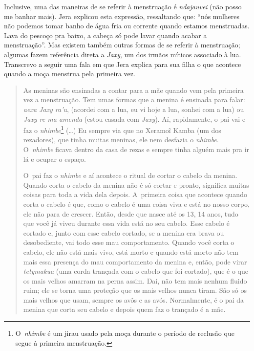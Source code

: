 Inclusive, uma das maneiras de se referir à menstruação é \emph{ndajauvei} (não
posso me banhar mais). Jera explicou esta expressão, ressaltando que:
``nós mulheres não podemos tomar banho de água fria ou corrente quando
estamos menstruadas. Lava do pescoço pra baixo, a cabeça só pode lavar
quando acabar a menstruação''. Mas existem também outras formas de se
referir à menstruação; algumas fazem referência direta a \emph{Jaxy}, um dos
irmãos míticos associado à lua. Transcrevo a seguir uma fala em que
Jera explica para sua filha o que acontece quando a moça menstrua pela
primeira vez. 

\begin{quote}
\noindent
As meninas são ensinadas a contar para a mãe quando vem pela primeira
vez a menstruação. Tem umas formas que a menina é ensinada para falar:
\emph{aexa Jaxy ra’u}, (acordei com a lua, eu vi hoje a lua, sonhei com a lua)
ou \emph{Jaxy re ma amenda} (estou casada com \emph{Jaxy}). Aí, rapidamente, o pai
vai e faz o \emph{nhimbe}\footnote{O~\emph{nhimbe} é um jirau usado pela moça durante
o período de reclusão que segue à primeira menstruação.} (\ldots{}) Eu
sempre via que no Xeramoĩ Kamba (um dos rezadores), que tinha muitas
meninas, ele nem desfazia o \emph{nhimbe}. O~\emph{nhimbe} ficava dentro da casa de
rezas e sempre tinha alguém mais pra ir lá e ocupar o espaço. 

\noindent
O~pai faz o \emph{nhimbe} e aí acontece o ritual de cortar o cabelo da menina.
Quando corta o cabelo da menina não é só cortar e pronto, significa
muitas coisas para toda a vida dela depois. A~primeira coisa que
acontece quando corta o cabelo é que, como o cabelo é uma coisa viva e
está no nosso corpo, ele não para de crescer. Então, desde que nasce
até os 13, 14 anos, tudo que você já viveu durante essa vida está no
seu cabelo. Esse cabelo é cortado e, junto com esse cabelo cortado, se
a menina era brava ou desobediente, vai todo esse mau comportamento.
Quando você corta o cabelo, ele não está mais vivo, está morto e quando
está morto não tem mais essa presença do mau comportamento da menina e,
então, pode virar \emph{tetymakua} (uma corda trançada com o cabelo que foi
cortado), que é o que os mais velhos amarram na perna assim. Daí, não
tem mais nenhum fluido ruim; ele se torna uma proteção que os mais
velhos nunca tiram. São só os mais velhos que usam, sempre os avôs e as
avós. Normalmente, é o pai da menina que corta seu cabelo e depois quem
faz o trançado é a mãe. 
\end{quote}

